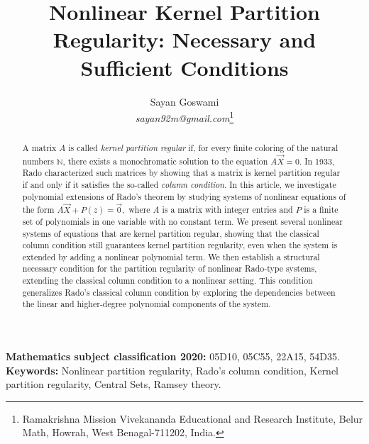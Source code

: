 \documentclass{article}
\date{\vspace{-5ex}}
\theoremstyle{Theorem}
\theoremstyle{definition}
\begin{document}
\title{{\bf Nonlinear Kernel Partition Regularity: Necessary and Sufficient  Conditions}}

\author{ 
Sayan Goswami\\  \textit{ sayan92m@gmail.com}\footnote{Ramakrishna Mission Vivekananda Educational and Research Institute, Belur Math,
Howrah, West Benagal-711202, India.}
}

         

\makeatother

\providecommand{\corollaryname}{Corollary}
\providecommand{\definitionname}{Definition}
\providecommand{\examplename}{Example}
\providecommand{\factname}{Fact}
\providecommand{\lemmaname}{Lemma}
\providecommand{\propositionname}{Proposition}
\providecommand{\remarkname}{Remark}
\providecommand{\theoremname}{Theorem}

\maketitle
\begin{abstract}
A matrix \( A \) is called \emph{kernel partition regular} if, for every finite coloring of the natural numbers \( \mathbb{N} \), there exists a monochromatic solution to the equation \( A\vec{X} = 0 \). In 1933, Rado characterized such matrices by showing that a matrix is kernel partition regular if and only if it satisfies the so-called \emph{column condition}. In this article, we investigate polynomial extensions of Rado’s theorem by studying systems of nonlinear equations of the form $A \vec{X} + P(z) = \vec{0},$ where $A$ is a matrix with integer entries and 
$P$ is a finite set of polynomials in one variable with no constant term.  We present several nonlinear systems of equations that are kernel partition regular, showing that the classical column condition still guarantees kernel partition regularity, even when the system is extended by adding a nonlinear polynomial term. We then establish a structural necessary condition for the partition regularity of nonlinear Rado-type systems, extending the classical column condition to a nonlinear setting. This condition generalizes Rado’s classical column condition by exploring the dependencies between the linear and higher-degree polynomial components of the system.
\end{abstract}
{\bf Mathematics subject classification 2020:} 05D10, 05C55, 22A15, 54D35.\\
{\bf Keywords:} Nonlinear partition regularity, Rado's column condition, Kernel partition regularity, Central Sets, Ramsey theory.
\end{document}
